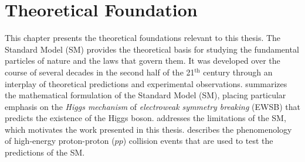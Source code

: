 \chapter{Theoretical Foundation}
\label{chap:theory}
This chapter presents the theoretical foundations relevant to this thesis.  
The Standard Model (SM) provides the theoretical basis for studying the fundamental particles of nature and the laws that govern them. It was developed over the course of several decades in the second half of the 21$^{\text{th}}$ century through an interplay of theoretical predictions and experimental observations.
 summarizes the mathematical formulation of the Standard Model (SM), placing particular emphasis on the \emph{Higgs mechanism} of \emph{electroweak symmetry breaking} (EWSB) that predicts the existence of the Higgs boson.
 addresses the limitations of the SM, which motivates the work presented in this thesis. 
 describes the phenomenology of high-energy proton-proton ($pp$) collision events that are used to test the predictions of the SM.



